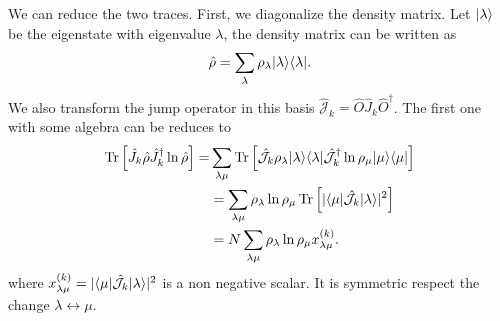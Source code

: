 We can reduce the two traces.
First, we diagonalize the density matrix. Let $\lvert\lambda\rangle$ be the eigenstate with eigenvalue $\lambda$, the density matrix can be written as
\begin{equation}
    \hat \rho = \sum_\lambda \rho_\lambda\lvert\lambda\rangle\langle\lambda\rvert.
\end{equation}
We also transform the jump operator in this basis $\hat{\mathcal{J}}_{k}= \hat O \hat J_{k}\hat O^\dagger$.
The first one with some algebra can be reduces to 
\begin{equation}
    \begin{split}
        \operatorname{Tr}\left[\hat J_{k} \hat\rho\hat J_{k}^\dagger\ln\hat\rho\right]=& \sum_{\lambda\mu}\operatorname{Tr}\left[\hat{\mathcal{J}}_{k} \rho_\lambda\lvert\lambda\rangle\langle\lambda\rvert\hat{\mathcal{J}}_{k}^\dagger\ln\rho_\mu \lvert\mu\rangle\langle\mu\rvert\right] \\
        &= \sum_{\lambda\mu}\rho_\lambda\ln\rho_\mu\operatorname{Tr}\left[|\langle\mu\rvert\hat{\mathcal{J}}_{k} \lvert\lambda\rangle|^2\right]\\
        &= N \sum_{\lambda\mu}\rho_\lambda\ln\rho_\mu x^{(k)}_{\lambda\mu}.
    \end{split}
\end{equation}
where $x^{(k)}_{\lambda\mu} = |\langle\mu\rvert\hat{\mathcal{J}}_{k} \lvert\lambda\rangle|^2$ is a non negative scalar. It is symmetric respect the change $\lambda \leftrightarrow \mu$. 

